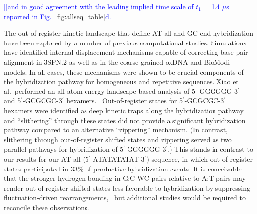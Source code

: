 \documentclass[journal=jpcbfk,manuscript=article]{achemso}
\newcommand*{\noteb}[1]{\textcolor{blue}{[[#1]]}}		%
\begin{document}
\noteb{and in good agreement with the leading implied time scale of $t_1$ = 1.4 $\mu$s reported in Fig.~\ref{fig:allseq_table}d.}



The out-of-register kinetic landscape that define AT-all and GC-end hybridization have been explored by a number of previous computational studies. Simulations have identified internal displacement mechanisms capable of correcting base pair alignment in 3SPN.2 \citep{Hinckley2014Coarse-grainedEffects} as well as in the coarse-grained oxDNA \citep{Romano2013DNADependence} and BioModi \citep{Markegard2015} models. In all cases, these mechanisms were shown to be crucial components of the hybridization pathway for homogeneous and repetitive sequences. Xiao et al.\ performed an all-atom energy landscape-based analysis of 5$^\prime$-GGGGGG-3$^\prime$ and 5$^\prime$-GCGCGC-3$^\prime$ hexamers.~\citep{Xiao2019} Out-of-register states for 5$^\prime$-GCGCGC-3$^\prime$ hexamers were identified as deep kinetic traps along the hybridization pathway and ``slithering'' through these states did not provide a significant hybridization pathway compared to an alternative ``zippering'' mechanism. (In contrast, slithering through out-of-register shifted states and zippering served as two parallel pathways for hybridization of 5$^\prime$-GGGGGG-3$^\prime$.) This stands in contrast to our results for our AT-all (5$^\prime$-ATATATATAT-3$^\prime$) sequence, in which out-of-register states participated in 33\% of productive hybridization events. It is conceivable that the stronger hydrogen bonding in G:C WC pairs relative to A:T pairs may render out-of-register shifted states less favorable to hybridization by suppressing fluctuation-driven rearrangements,~\citep{Yakovchuk2006Base-stackingHelix,Zacharias2020Base-PairingFormation} but additional studies would be required to reconcile these observations.
\end{document}
